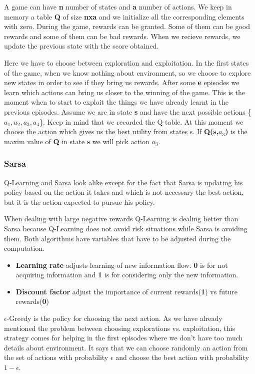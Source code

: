 A game can have \textbf{n} number of states and \textbf{a} number of actions. We keep in memory a table \textbf{Q} of size \textbf{nxa} and we initialize all the corresponding elements with zero. During the game, rewards can be granted. Some of them can be good rewards and some of them can be bad rewards. When we recieve rewards, we update the previous state with the score obtained.

Here we have to choose between exploration and exploitation. In the first states of the game, when we know nothing about environment, so we choose to explore new states in order to see if they bring us rewards. After some \textbf{e} episodes we learn which actions can bring us closer to the winning of the game. This is the moment when to start to exploit the things we have already learnt in the previous episodes. Assume we are in state \textbf{s} and have the next possible actions \{$a_{1},a_{2},a_{3},a_{4}$\}. Keep in mind that we recorded the Q-table. At this moment we choose the action which gives us the best utility from states s. If \textbf{Q(s,$a_{3}$)} is the maxim value of \textbf{Q} in state \textbf{s} we will pick action \textbf{$a_{3}$}.

\subsubsection{Sarsa}
\label{sarsa}
Q-Learning and Sarsa look alike except for the fact that Sarsa is updating his policy based on the action it takes and which is not necessary the best action, but it is the action expected to pursue his policy.


When dealing with large negative rewards Q-Learning is dealing better than Sarsa\cite{multi-agent} because Q-Learning does not avoid risk situations while Sarsa is avoiding them. Both algorithms have variables that have to be adjusted during the computation.

\begin{itemize}
  \item \textbf{Learning rate} adjusts learning of new information flow. \textbf{0} is for not acquiring information and \textbf{1} is for considering only the new information.
  \item \textbf{Discount factor} adjust the importance of current rewards(\textbf{1}) vs future rewards(\textbf{0})
\end{itemize}

$\epsilon$-Greedy is the policy for choosing the next action. As we have already mentioned the problem between choosing explorations vs. exploitation, this strategy comes for helping in the first episodes where we don't have too much details about environment. It says that we can choose randomly an action from the set of actions with probability $\epsilon$ and choose the best action with probability $1-\epsilon$.

